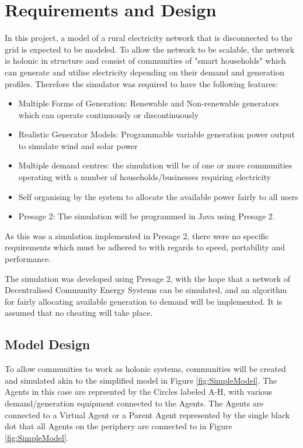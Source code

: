 \chapter{Requirements and Design}
\label{Requirements and Design}
In this project, a model of a rural electricity network that is disconnected to the grid is expected to be modeled. To allow the network to be scalable, the network is holonic in structure and consist of communities of "smart households" which can generate and utilise electricity depending on their demand and generation profiles. Therefore the simulator was required to have the following features:
\begin{itemize}
  \item Multiple Forms of Generation: Renewable and Non-renewable generators which can operate continuously or discontinuously
  \item Realistic Generator Models: Programmable variable generation power output to simulate wind and solar power
  \item Multiple demand centres: the simulation will be of one or more communities operating with a number of households/businesses requiring electricity
  \item Self organising by the system to allocate the available power fairly to all users
  \item Presage 2: The simulation will be programmed in Java using Presage 2.
\end{itemize}

As this was a simulation implemented in Presage 2, there were no specific requirements which must be adhered to with regards to speed, portability and performance.  

The simulation was developed using Presage 2, with the hope that a network of Decentralised Community Energy Systems can be simulated, and an algorithm for fairly allocating available generation to demand will be implemented. It is assumed that no cheating will take place.

\section*{Model Design}
To allow communities to work as holonic systems, communities will be created and simulated akin to the simplified model in Figure \ref{fig:SimpleModel}. The Agents in this case are reprsented by the Circles labeled A-H, with various demand/generation equipment connected to the Agents. The Agents are connected to a Virtual Agent or a Parent Agent represented by the single black dot that all Agents on the periphery are connected to in Figure \ref{fig:SimpleModel}.


